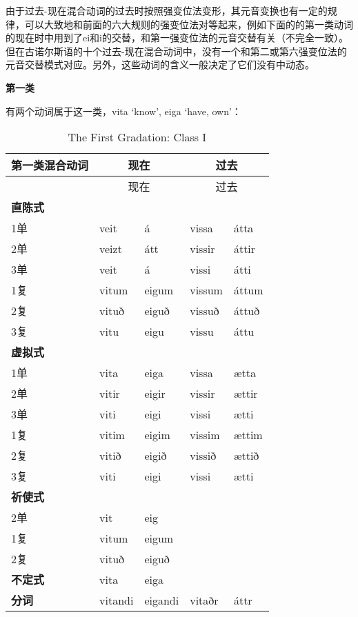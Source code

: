 由于过去-现在混合动词的过去时按照强变位法变形，其元音变换也有一定的规律，可以大致地和前面的六大规则的强变位法对等起来，例如下面的的第一类动词的现在时中用到了ei和i的交替，和第一强变位法的元音交替有关（不完全一致）。但在古诺尔斯语的十个过去-现在混合动词中，没有一个和第二或第六强变位法的元音交替模式对应。另外，这些动词的含义一般决定了它们没有中动态。

\textbf{第一类}

有两个动词属于这一类，vita `know‌', eiga `have, own‌'：

\begin{longtable}{lllll}
\caption[The First Gradation: Class I]{The First Gradation: Class
I}\tabularnewline
\toprule
第一类混合动词 &\multicolumn{2}{c}{现在} &\multicolumn{2}{c}{过去} \\\midrule\endfirsthead{} &\multicolumn{2}{c}{现在} &\multicolumn{2}{c}{过去} \\
\midrule
\endhead
\bottomrule
\endfoot
\textbf{直陈式} & ~ & ~ & ~ & ~ \\
1单 & veit & á & vissa & átta \\
2单 & veizt & átt & vissir & áttir \\
3单 & veit & á & vissi & átti \\
1复 & vitum & eigum & vissum & áttum \\
2复 & vituð & eiguð & vissuð & áttuð \\
3复 & vitu & eigu & vissu & áttu \\
\textbf{虚拟式} & ~ & ~ & ~ & ~ \\
1单 & vita & eiga & vissa & ætta \\
2单 & vitir & eigir & vissir & ættir \\
3单 & viti & eigi & vissi & ætti \\
1复 & vitim & eigim & vissim & ættim \\
2复 & vitið & eigið & vissið & ættið \\
3复 & viti & eigi & vissi & ætti \\
\textbf{祈使式} & ~ & ~ & ~ & ~ \\
2单 & vit & eig & ~ & ~ \\
1复 & vitum & eigum & ~ & ~ \\
2复 & vituð & eiguð & ~ & ~ \\
\textbf{不定式} & vita & eiga & ~ & ~ \\
\textbf{分词} & vitandi & eigandi & vitaðr & áttr \\
\end{longtable}

